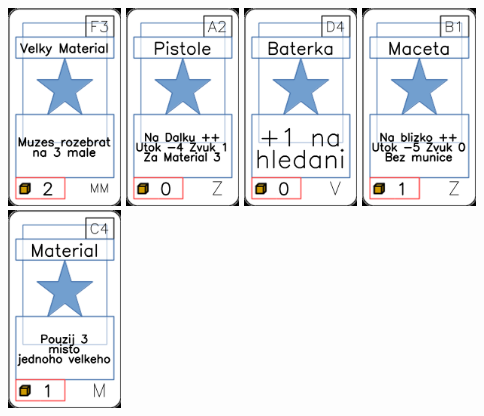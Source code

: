 \documentclass[a4paper]{article}
\begin{document}
	\includegraphics[width=3.0cm]{img-1_57}
	\includegraphics[width=3.0cm]{img-1_91}
	\includegraphics[width=3.0cm]{img-1_78}
	\includegraphics[width=3.0cm]{img-1_95}
	\includegraphics[width=3.0cm]{img-1_43}
\end{document}
